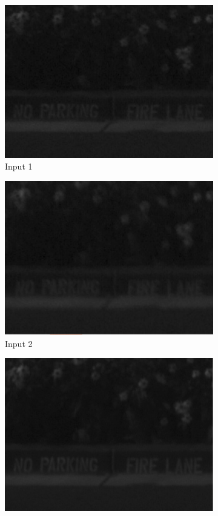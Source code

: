 \documentclass[a4paper,10pt]{report}
\begin{document}
\begin{figure}[h]
\begin{subfigure}{0.32\textwidth}
    \label{fig:anthro_result}
  \end{subfigure}
  \begin{subfigure}{0.32\textwidth}
    \includegraphics[width=0.9\linewidth]{ressource/detail_fire1.png} 
    \caption{Input 1}
    \label{fig:fire1}
  \end{subfigure}
  \begin{subfigure}{0.32\textwidth}
    \includegraphics[width=0.9\linewidth]{ressource/detail_fire3.png} 
    \caption{Input 2}
    \label{fig:fire3}
  \end{subfigure}
  \begin{subfigure}{0.32\textwidth}
    \includegraphics[width=0.9\linewidth]{ressource/detail_fire_res.png} 

\end{subfigure}
\end{figure}
\end{document}
